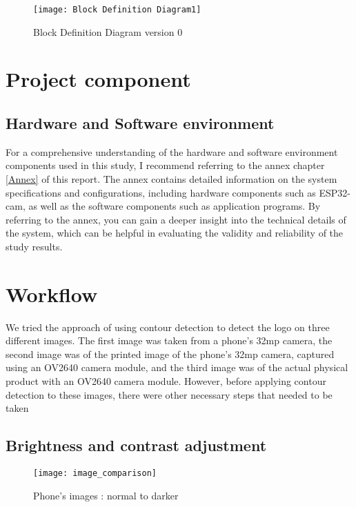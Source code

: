 \FloatBarrier
\FloatBarrier
\begin{figure}[h]
\FloatBarrier
         \centering
        \texttt{[image: Block Definition Diagram1]}
   
        \caption{Block Definition Diagram version 0}
        \label{Block Definition Diagram version 0}
\FloatBarrier
    \end{figure}


\FloatBarrier




\section{Project component}
\subsection{Hardware and Software environment}
For a comprehensive understanding of the hardware and software environment components used in this study, I recommend referring to the annex chapter \ref{Annex} of this report. The annex contains detailed information on the system specifications and configurations, including hardware components such as ESP32-cam, as well as the software components such as  application programs. By referring to the annex, you can gain a deeper insight into the technical details of the system, which can be helpful in evaluating the validity and reliability of the study results.


\section{Workflow}
We tried the approach of using contour detection to detect the logo on three different images. The first image was taken from a phone's 32mp camera, the second image was of the printed image of the phone's 32mp camera, captured using an OV2640 camera module, and the third image was of the actual physical product with an OV2640 camera module. However, before applying contour detection to these images, there were other necessary steps that needed to be taken
\subsection{Brightness and contrast adjustment}

\FloatBarrier
\begin{figure}[h]
\FloatBarrier
         \centering
        \texttt{[image: image\_comparison]}
   
        \caption{Phone's images : normal to darker}
        \label{fig:Phone's images : normal to darker}
\FloatBarrier
    \end{figure}


